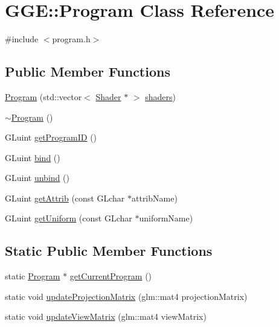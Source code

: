 \hypertarget{class_g_g_e_1_1_program}{\section{G\+G\+E\+:\+:Program Class Reference}
\label{class_g_g_e_1_1_program}
}


{\ttfamily \#include $<$program.\+h$>$}

\subsection*{Public Member Functions}
\begin{DoxyCompactItemize}
\item 
\hyperlink{class_g_g_e_1_1_program_a3879f737244244d8689b2708de63c55f}{Program} (std\+::vector$<$ \hyperlink{class_g_g_e_1_1_shader}{Shader} $\ast$ $>$ \hyperlink{class_g_g_e_1_1_program_a6f31b509c852f7271282d5ad79056b18}{shaders})
\item 
\hyperlink{class_g_g_e_1_1_program_aab1fc451cf7e926bf4bb9f8c99d904ed}{$\sim$\+Program} ()
\item 
G\+Luint \hyperlink{class_g_g_e_1_1_program_aeb2aa9fb22fd5ce5d6d981d3308ec576}{get\+Program\+I\+D} ()
\item 
G\+Luint \hyperlink{class_g_g_e_1_1_program_ab8444f45bd2a41920a41e84d2023d2d1}{bind} ()
\item 
G\+Luint \hyperlink{class_g_g_e_1_1_program_ab703c352644e33680907edfde5140654}{unbind} ()
\item 
G\+Luint \hyperlink{class_g_g_e_1_1_program_aec23fac66944617abdb3beb82b8886a0}{get\+Attrib} (const G\+Lchar $\ast$attrib\+Name)
\item 
G\+Luint \hyperlink{class_g_g_e_1_1_program_af1d316e47de393df33d9f6e58292fbdb}{get\+Uniform} (const G\+Lchar $\ast$uniform\+Name)
\end{DoxyCompactItemize}
\subsection*{Static Public Member Functions}
\begin{DoxyCompactItemize}
\item 
static \hyperlink{class_g_g_e_1_1_program}{Program} $\ast$ \hyperlink{class_g_g_e_1_1_program_a37badf65e989bee6d3dc3842ae0b5ccf}{get\+Current\+Program} ()
\item 
static void \hyperlink{class_g_g_e_1_1_program_a5e1fa577efd1cd96531b2a0a8e497423}{update\+Projection\+Matrix} (glm\+::mat4 projection\+Matrix)
\item 
static void \hyperlink{class_g_g_e_1_1_program_a2ad116e144ea1c29b33a6d28e0ff1447}{update\+View\+Matrix} (glm\+::mat4 view\+Matrix)
\end{DoxyCompactItemize}

